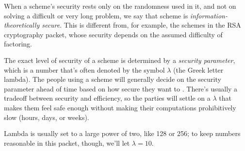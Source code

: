 When a scheme's security rests only on the randomness used in it, and not on 
solving a difficult or very long problem, we say that scheme is
\emph{information-theoretically secure}. This is different from, for example,
the schemes in the RSA cryptography packet, whose security depends on 
the assumed difficulty of factoring\footnotemark.


The exact level of security of a scheme is determined by a \emph{security 
parameter}, which is a number that's often denoted by the symbol $\lambda$ 
(the Greek letter lambda). The people using a scheme will generally decide 
on the security parameter ahead of time based on how secure they want to
. 
There's usually a tradeoff between security and efficiency, so the 
parties will settle on a $\lambda$ that makes them feel safe enough without 
making their computations prohibitively slow (hours, days, or weeks).

Lambda is usually set to a large power of two, like 128 or 256; to keep 
numbers reasonable in this packet, though, we'll let $\lambda=10$.
